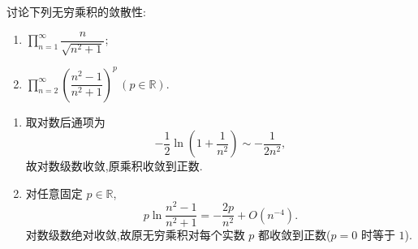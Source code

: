\begin{example}
    讨论下列无穷乘积的敛散性:
    \begin{enumerate}
        \item $\displaystyle\prod\limits_{n=1}^{\infty}\dfrac{n}{\sqrt{n^2+1}}$;
        \item $\displaystyle\prod\limits_{n=2}^{\infty}\left(\dfrac{n^2-1}{n^2+1}\right)^p\,(p\in\mathbb{R})$.
    \end{enumerate}
\end{example}
\exampleblank

\begin{solution}
    \leavevmode
    \begin{enumerate}
        \item 取对数后通项为
              \[
                  -\dfrac{1}{2}\ln\left(1+\dfrac{1}{n^2}\right)\sim-\dfrac{1}{2n^2},
              \]
              故对数级数收敛,原乘积收敛到正数.
        \item 对任意固定 $p\in\mathbb{R}$,
              \[
                  p\ln\dfrac{n^2-1}{n^2+1}
                  =-\dfrac{2p}{n^2}+O(n^{-4}).
              \]
              对数级数绝对收敛,故原无穷乘积对每个实数 $p$ 都收敛到正数($p=0$ 时等于 $1$).
    \end{enumerate}
\end{solution}
